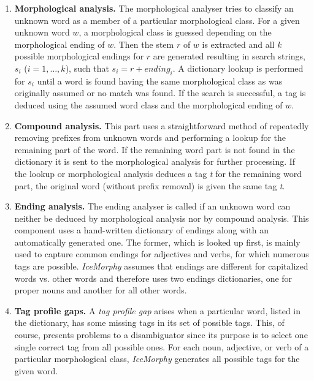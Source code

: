 \documentclass[11pt]{article}
\begin{document}
\begin{enumerate}
\item{\bf Morphological analysis.}
The morphological analyser tries to classify an unknown word as a member of a particular morphological class.
For a given unknown word $w$, a morphological class is guessed depending on the morphological ending of $w$.
Then the stem $r$ of $w$ is extracted and all $k$ possible morphological endings for $r$ are generated resulting in search strings, $s_{i}$ ($i=1,\ldots,k$), such that $s_{i}=r+ending_{i}$.
A dictionary lookup is performed for $s_{i}$ until a word is found having the same morphological class as was originally assumed or no match was found.
If the search is successful, a tag is deduced using the assumed word class and the morphological ending of $w$.

\item{\bf Compound analysis.}
This part uses a straightforward method of repeatedly removing prefixes from unknown words and performing a lookup for the remaining part of the word.
If the remaining word part is not found in the dictionary it is sent to the morphological analysis for further processing.
If the lookup or morphological analysis deduces a tag \emph{t} for the remaining word part, the original word (without prefix removal) is given the same tag \emph{t}.

\item{\bf Ending analysis.}
The ending analyser is called if an unknown word can neither be deduced by morphological analysis nor by compound analysis.
This component uses a hand-written dictionary of endings along with an automatically generated one.
The former, which is looked up first, is mainly used to capture common endings for adjectives and verbs, for which numerous tags are possible.
\emph{IceMorphy} assumes that endings are different for capitalized words vs. other words and therefore uses two endings dictionaries, one for proper nouns and another for all other words.

\item{\bf Tag profile gaps.}
A \emph{tag profile gap} arises when a particular word, listed in the dictionary, has some missing tags in its set of possible tags.
This, of course, presents problems to a disambiguator since its purpose is to select one single correct tag from all possible ones.
For each noun, adjective, or verb of a particular morphological class, \emph{IceMorphy} generates all possible tags for the given word.
\end{enumerate}
\end{document}

